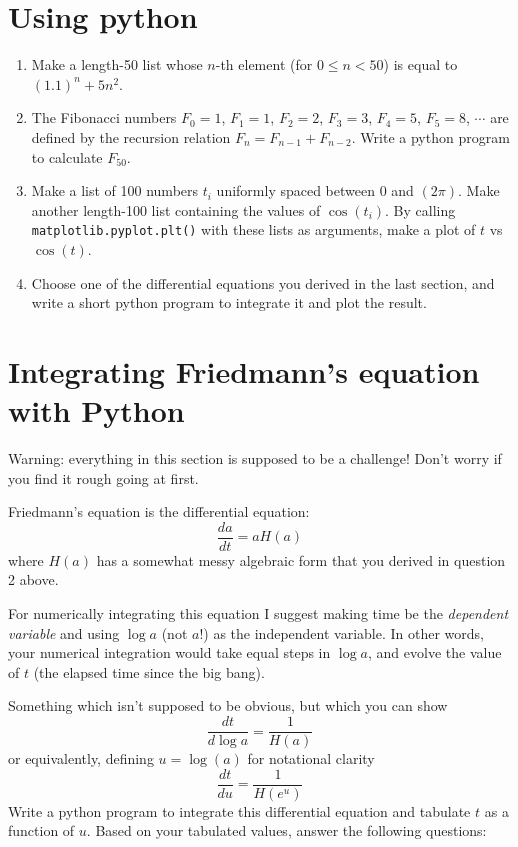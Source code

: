\documentclass[aps,prd,superscriptaddress,groupedaddress,nofootinbib,nobibnotes]{revtex4}
\newcommand{\be}{\begin{equation}}
\newcommand{\ee}{\end{equation}}
\begin{document}
\section{Using python}

\begin{enumerate}[resume]

\item Make a length-50 list whose $n$-th element (for $0 \le n < 50$) is equal to $(1.1)^n + 5n^2$.

\item The Fibonacci numbers $F_0=1$, $F_1=1$, $F_2=2$, $F_3=3$, $F_4=5$, $F_5=8$, $\cdots$
  are defined by the recursion relation $F_n = F_{n-1} + F_{n-2}$.  Write a python program to calculate $F_{50}$.

\item Make a list of 100 numbers $t_i$ uniformly spaced between 0 and $(2\pi)$.
  Make another length-100 list containing the values of $\cos(t_i)$.  By calling
  {\tt matplotlib.pyplot.plt()} with these lists as arguments, make a plot of $t$ vs $\cos(t)$.

\item Choose one of the differential equations you derived in the last section, and
  write a short python program to integrate it and plot the result.

\end{enumerate}

\section{Integrating Friedmann's equation with Python}

Warning: everything in this section is supposed to be a challenge!
Don't worry if you find it rough going at first.

Friedmann's equation is the differential equation:
\be
\frac{da}{dt} = a H(a)
\ee
where $H(a)$ has a somewhat messy algebraic form that you derived in question 2 above.

For numerically integrating this equation I suggest making time be the {\em dependent variable}
and using $\log a$ (not $a$!) as the independent variable.  In other words, your numerical integration
would take equal steps in $\log a$, and evolve the value of $t$ (the elapsed time since the big bang).

Something which isn't supposed to be obvious, but which you can show 
\be
\frac{dt}{d\log a} = \frac{1}{H(a)}
\ee
or equivalently, defining $u=\log(a)$ for notational clarity
\be
\frac{dt}{du} = \frac{1}{H(e^u)}
\ee
Write a python program to integrate this differential equation and tabulate $t$ as a function of $u$.
Based on your tabulated values, answer the following questions:
\end{document}
